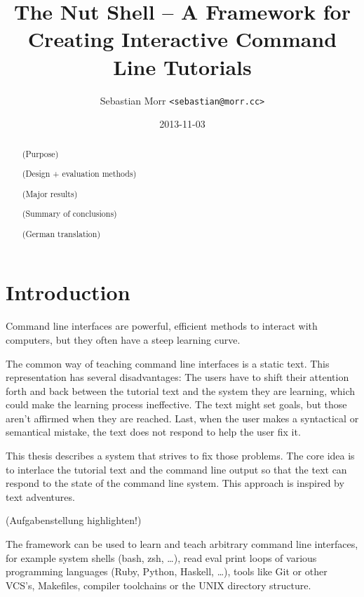 \documentclass[a4paper,twoside,abstract=on,cleardoublepage=empty,numbers=noenddot,toc=bib]{scrreprt}
\title{The Nut Shell -- A Framework for Creating Interactive Command Line Tutorials}
\author{Sebastian Morr \texttt{<sebastian@morr.cc>}}
\date{2013-11-03}
\begin{document}
\maketitle
\restoregeometry


\begin{abstract}

    \blindtext

    (Purpose)

    (Design + evaluation methods)

    (Major results)

    (Summary of conclusions)
\end{abstract}

%
\begin{abstract}
    \blindtext

    (German translation)
\end{abstract}
%

\setcounter{tocdepth}{2}
\tableofcontents


\chapter{Introduction}

Command line interfaces are powerful, efficient methods to interact with computers, but they often have a steep learning curve.

The common way of teaching command line interfaces is a static text. This representation has several disadvantages: The users have to shift their attention forth and back between the tutorial text and the system they are learning, which could make the learning process ineffective. The text might set goals, but those aren't affirmed when they are reached. Last, when the user makes a syntactical or semantical mistake, the text does not respond to help the user fix it.

This thesis describes a system that strives to fix those problems. The core idea is to interlace the tutorial text and the command line output so that the text can respond to the state of the command line system. This approach is inspired by text adventures.

(Aufgabenstellung highlighten!)

The framework can be used to learn and teach arbitrary command line interfaces, for example system shells (bash, zsh, …), read eval print loops of various programming languages (Ruby, Python, Haskell, …), tools like Git or other VCS's, Makefiles, compiler toolchains or the UNIX directory structure.
\end{document}
